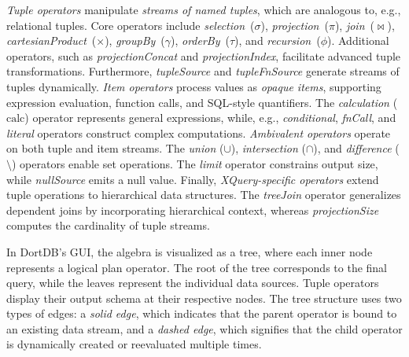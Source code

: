 \textit{Tuple operators} manipulate \textit{streams of named tuples}, which are analogous to, e.g., relational tuples. Core operators include \textit{selection}~($\sigma$), \textit{projection}~($\pi$), \textit{join}~($\bowtie$), \textit{cartesianProduct}~($\times$), \textit{groupBy}~($\gamma$), \textit{orderBy}~($\tau$), and \textit{recursion}~($\phi$). Additional operators, such as \textit{projectionConcat} and \textit{projectionIndex}, facilitate advanced tuple transformations. Furthermore, \textit{tupleSource} and \textit{tupleFnSource} generate streams of tuples dynamically.
\textit{Item operators} process values as \textit{opaque items}, supporting expression evaluation, function calls, and SQL-style quantifiers. The \textit{calculation} ($\text{calc}$) operator represents general expressions, while, e.g.,  \textit{conditional}, \textit{fnCall}, and \textit{literal} operators construct complex computations.
\textit{Ambivalent operators} operate on both tuple and item streams. The \textit{union} ($\cup$), \textit{intersection} ($\cap$), and \textit{difference} ($\setminus$) operators enable set operations. The \textit{limit} operator constrains output size, while \textit{nullSource} emits a null value.
Finally, \textit{XQuery-specific operators} extend tuple operations to hierarchical data structures. The \textit{treeJoin} operator generalizes dependent joins by incorporating hierarchical context, whereas \textit{projectionSize} computes the cardinality of tuple streams.


In DortDB’s GUI, the algebra is visualized as a tree, where each inner node represents a logical plan operator. The root of the tree corresponds to the final query, while the leaves represent the individual data sources. Tuple operators display their output schema at their respective nodes. The tree structure uses two types of edges: a \textit{solid edge}, which indicates that the parent operator is bound to an existing data stream, and a \textit{dashed edge}, which signifies that the child operator is dynamically created or reevaluated multiple times.



